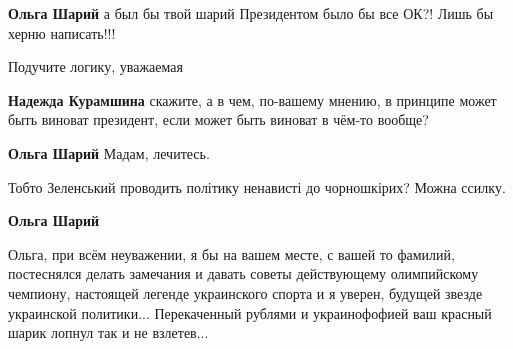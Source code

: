 \begin{itemize}
\begin{itemize}
\textbf{Ольга Шарий} а был бы твой шарий Президентом было бы все ОК?! Лишь бы херню написать!!!

 
Подучите логику, уважаемая

 
\textbf{Надежда Курамшина} скажите, а в чем, по-вашему мнению, в принципе может быть
виноват президент, если может быть виноват в чём-то вообще?

 
\textbf{Ольга Шарий} Мадам, лечитесь.

 
Тобто Зеленський проводить політику ненависті до чорношкірих? Можна ссилку.

 
\textbf{Ольга Шарий}

Ольга, при всём неуважении, я бы на вашем месте, с вашей то фамилий,
постеснялся делать замечания и давать советы действующему олимпийскому
чемпиону, настоящей легенде украинского спорта и я уверен, будущей звезде
украинской политики...  Перекаченный рублями и украинофофией ваш красный шарик
лопнул так и не взлетев...

 

\end{itemize}
\end{itemize}
